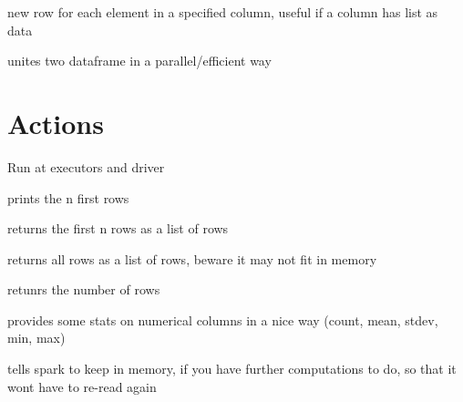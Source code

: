 			  new row for each element in a specified column, useful if a column has list as data

			 unites two dataframe in a parallel/efficient way


\section{Actions}

	Run at executors and driver

	 prints the n first rows

	 returns the first n rows as a list of rows

	 returns all rows as a list of rows, beware it may not fit in memory

	 retunrs the number of rows

	 provides some stats on numerical columns in a nice way (count, mean, stdev, min, max)

	 tells spark to keep in memory, if you have further computations to do, so that it wont have to re-read again






